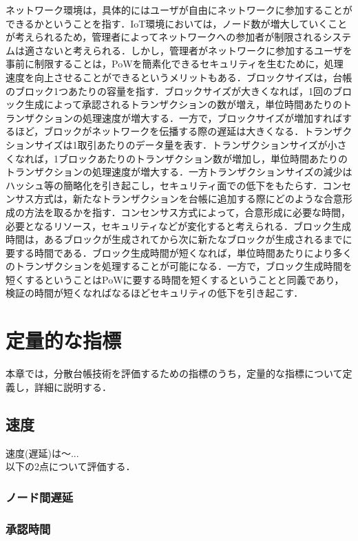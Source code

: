 \documentclass{kuisthesis}			%
\begin{document}
ネットワーク環境は，具体的にはユーザが自由にネットワークに参加することができるかということを指す．IoT環境においては，ノード数が増大していくことが考えられるため，管理者によってネットワークへの参加者が制限されるシステムは適さないと考えられる．しかし，管理者がネットワークに参加するユーザを事前に制限することは，PoWを簡素化できるセキュリティを生むために，処理速度を向上させることができるというメリットもある．ブロックサイズは，台帳のブロック1つあたりの容量を指す．ブロックサイズが大きくなれば，1回のブロック生成によって承認されるトランザクションの数が増え，単位時間あたりのトランザクションの処理速度が増大する．一方で，ブロックサイズが増加すればするほど，ブロックがネットワークを伝播する際の遅延は大きくなる．トランザクションサイズは1取引あたりのデータ量を表す．トランザクションサイズが小さくなれば，1ブロックあたりのトランザクション数が増加し，単位時間あたりのトランザクションの処理速度が増大する．一方トランザクションサイズの減少はハッシュ等の簡略化を引き起こし，セキュリティ面での低下をもたらす．コンセンサス方式は，新たなトランザクションを台帳に追加する際にどのような合意形成の方法を取るかを指す．コンセンサス方式によって，合意形成に必要な時間，必要となるリソース，セキュリティなどが変化すると考えられる．ブロック生成時間は，あるブロックが生成されてから次に新たなブロックが生成されるまでに要する時間である．ブロック生成時間が短くなれば，単位時間あたりにより多くのトランザクションを処理することが可能になる．一方で，ブロック生成時間を短くするということはPoWに要する時間を短くするということと同義であり，検証の時間が短くなればなるほどセキュリティの低下を引き起こす．\\

\section{定量的な指標}
本章では，分散台帳技術を評価するための指標のうち，定量的な指標について定義し，詳細に説明する．

\subsection{速度}
速度(遅延)は〜...\\
以下の2点について評価する．
\subsubsection{ノード間遅延}
\subsubsection{承認時間}
\end{document}
